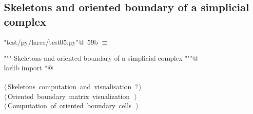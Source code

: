 \documentclass[11pt,oneside]{article}    %
\begin{document}
\subsection{Skeletons and oriented boundary of a simplicial complex}


\begin{flushleft} \small
\begin{minipage}{\linewidth} \label{scrap109}
\protect{}\verb@"test/py/larcc/test05.py"@\nobreak\ {\footnotesize 59b }$\equiv$
\vspace{-1ex}
\begin{list}{}{} \item
\mbox{}\verb@""" Skeletons and oriented boundary of a simplicial complex """@\\
\mbox{}\verb@from larlib import *@\\
\mbox{}\verb@@\\
\mbox{}\verb@@\hbox{$\langle\,$Skeletons computation and visualisation\nobreak\ {\footnotesize ?}$\,\rangle$}\verb@@\\
\mbox{}\verb@@\hbox{$\langle\,$Oriented boundary matrix visualization\nobreak\ {\footnotesize {}}$\,\rangle$}\verb@@\\
\mbox{}\verb@@\hbox{$\langle\,$Computation of oriented boundary cells\nobreak\ {\footnotesize {}}$\,\rangle$}\verb@@\\
\mbox{}\verb@@{\NWsep}
\end{list}
\vspace{-2ex}
\end{minipage}\\[4ex]
\end{flushleft}
\end{document}
